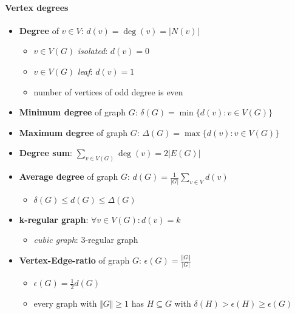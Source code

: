 \paragraph{Vertex degrees}
\begin{itemize}
  \item \textbf{Degree} of $ v \in V $: $ d(v) = \deg(v) = \vert N(v) \vert $
  \begin{itemize}
    \item $ v \in V(G) $ \emph{isolated}: $ d(v) = 0 $
    \item $ v \in V(G) $ \emph{leaf}: $ d(v) = 1 $
    \item number of vertices of odd degree is even
  \end{itemize}
  \item \textbf{Minimum degree} of graph $ G $: $ \delta(G) = \min\{ d(v) : v \in V(G) \} $
  \item \textbf{Maximum degree} of graph $ G $: $ \Delta(G) = \max\{ d(v) : v \in V(G) \} $
  \item \textbf{Degree sum}: $ \sum_{v \in V(G)} \deg(v) = 2\vert E(G) \vert $
  \item \textbf{Average degree} of graph $ G $: $ d(G) = \frac{1}{\vert G \vert}\sum_{v\in V} d(v) $
  \begin{itemize}
    \item $ \delta(G) \leq d(G) \leq \Delta(G) $ 
  \end{itemize}
  \item \textbf{k-regular graph}: $ \forall v \in V(G) : d(v) = k $
  \begin{itemize}
    \item \emph{cubic graph}: $ 3 $-regular graph 
  \end{itemize}
  \item \textbf{Vertex-Edge-ratio} of graph $ G $: $ \epsilon(G) = \frac{\Vert G \Vert}{\vert G \vert} $
  \begin{itemize}
    \item $ \epsilon(G) = \frac{1}{2}d(G) $
    \item every graph with $ \Vert G \Vert \geq 1 $ has $ H \subseteq G $ with $ \delta(H) > \epsilon(H) \geq \epsilon(G) $
  \end{itemize}
\end{itemize}

